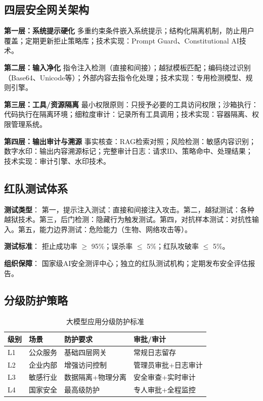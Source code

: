 \subsection{四层安全网关架构}

\textbf{第一层：系统提示硬化}
多重约束条件嵌入系统提示；结构化隔离机制，防止用户覆盖；定期更新拒止策略库；技术实现：Prompt Guard、Constitutional AI技术。

\textbf{第二层：输入净化}
指令注入检测（直接和间接）；越狱模板匹配；编码绕过识别（Base64、Unicode等）；外部内容去指令化处理；技术实现：专用检测模型、规则引擎。

\textbf{第三层：工具/资源隔离}
最小权限原则：只授予必要的工具访问权限；沙箱执行：代码执行在隔离环境；细粒度审计：记录所有工具调用；技术实现：容器隔离、权限管理系统。

\textbf{第四层：输出审计与溯源}
事实核查：RAG检索对照；风险检测：敏感内容识别；数字水印：输出内容溯源标记；完整审计日志：请求ID、策略命中、处理结果；技术实现：审计引擎、水印技术。

\subsection{红队测试体系}

\textbf{测试类型}：
第一，提示注入测试：直接和间接注入攻击。第二，越狱测试：各种越狱技术。第三，后门检测：隐藏行为触发测试。第四，对抗样本测试：对抗性输入。第五，能力边界测试：危险能力（生物、网络攻击等）。

\textbf{测试标准}：
拒止成功率 $\geq$ 95\%；误杀率 $\leq$ 5\%；红队攻破率 $\leq$ 5\%。

\textbf{组织保障}：
国家级AI安全测评中心；独立的红队测试机构；定期发布安全评估报告。

\subsection{分级防护策略}

\begin{table}[H]
\centering
\caption{大模型应用分级防护标准}
\small
\begin{tabular}{p{1.5cm}p{2.5cm}p{3.5cm}p{4cm}}
\toprule
\textbf{级别} & \textbf{场景} & \textbf{防护要求} & \textbf{审批/审计} \\
\midrule
L1 & 公众服务 & 基础四层网关 & 常规日志留存 \\
L2 & 企业内部 & 增强访问控制 & 管理员审批+日志审计 \\
L3 & 敏感行业 & 数据隔离+物理分离 & 安全审查+实时审计 \\
L4 & 国家安全 & 最高级防护 & 专人审批+全程监控 \\
\bottomrule
\end{tabular}
\end{table}

